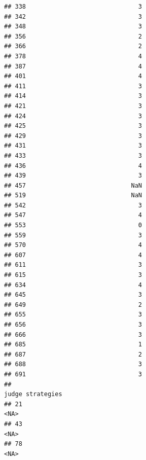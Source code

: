 \documentclass[
]{article}
\begin{document}
\begin{verbatim}
## 338                               3
## 342                               3
## 348                               3
## 356                               2
## 366                               2
## 378                               4
## 387                               4
## 401                               4
## 411                               3
## 414                               3
## 421                               3
## 424                               3
## 425                               3
## 429                               3
## 431                               3
## 433                               3
## 436                               4
## 439                               3
## 457                             NaN
## 519                             NaN
## 542                               3
## 547                               4
## 553                               0
## 559                               3
## 570                               4
## 607                               4
## 611                               3
## 615                               3
## 634                               4
## 645                               3
## 649                               2
## 655                               3
## 656                               3
## 666                               3
## 685                               1
## 687                               2
## 688                               3
## 691                               3
##                                                                                                                                                                                                                                                                                                                                        judge strategies
## 21                                                                                                                                                                                                                                                                                                                                                 <NA>
## 43                                                                                                                                                                                                                                                                                                                                                 <NA>
## 78                                                                                                                                                                                                                                                                                                                                                 <NA>

\end{verbatim}
\end{document}
